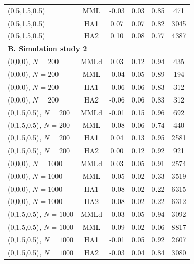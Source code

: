 \documentclass[aoas,preprint]{imsart}
\numberwithin{equation}{section}
\theoremstyle{plain}
\begin{document}
\begin{table}[ht]
\begin{tabular}{lccccc}
  (0.5,1.5,0.5) & MML & -0.03 & 0.03 & 0.85 & 471  \\
  (0.5,1.5,0.5) & HA1 & 0.07 & 0.07 & 0.82 & 3045 \\
  (0.5,1.5,0.5) & HA2 & 0.10 & 0.08 & 0.77 & 4387 \\
  \hline
    \multicolumn{6}{l}{\textbf{B. Simulation study 2}}   \\
  \hline
  (0,0,0), $N=200$ & MMLd & 0.03 & 0.12 & 0.94 & 435 \\
  (0,0,0), $N=200$ & MML & -0.04 & 0.05 & 0.89 & 194 \\
  (0,0,0), $N=200$ & HA1 & -0.06 & 0.06 & 0.83 & 312 \\
  (0,0,0), $N=200$ & HA2 & -0.06 & 0.06 & 0.83 & 312 \\
  (0,1.5,0.5), $N=200$ & MMLd & -0.01 & 0.15 & 0.96 & 692  \\
  (0,1.5,0.5), $N=200$ & MML & -0.08 & 0.06 & 0.74 & 440 \\
  (0,1.5,0.5), $N=200$ & HA1 & 0.04 & 0.13 & 0.95 & 2581 \\
  (0,1.5,0.5), $N=200$ & HA2 & 0.00 & 0.12 & 0.92 & 921 \\
  (0,0,0), $N=1000$ & MMLd & 0.03 & 0.05 & 0.91 & 2574 \\
  (0,0,0), $N=1000$ & MML & -0.05 & 0.02 & 0.33 & 3519 \\
  (0,0,0), $N=1000$ & HA1 & -0.08 & 0.02 & 0.22 & 6315 \\
  (0,0,0), $N=1000$ & HA2 & -0.08 & 0.02 & 0.22 & 6312 \\
  (0,1.5,0.5), $N=1000$ & MMLd & -0.03 & 0.05 & 0.94 & 3092 \\
  (0,1.5,0.5), $N=1000$ & MML & -0.09 & 0.02 & 0.06 & 8817  \\
  (0,1.5,0.5), $N=1000$ & HA1 & -0.01 & 0.05 & 0.92 & 2607 \\
  (0,1.5,0.5), $N=1000$ & HA2 & -0.03 & 0.04 & 0.84 & 3080 \\
\hline
\end{tabular}
\end{table}
\end{document}

